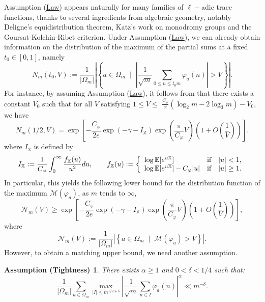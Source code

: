 \documentclass[12pt]{amsart}
\newtheorem*{AssT}{Assumption (Tightness)}
\theoremstyle{definition}
\numberwithin{equation}{section}
\numberwithin{equation}{section}
\def\E{\mathbb{E}}
\def\Ncal{\mathcal{N}}
\def\M{\mathcal{M}}
\def\Mp{C_\varphi}
\def\X{\mathbb{X}}
\def\E{\mathbb{E}}
\begin{document}
Assumption (\hyperlink{Ass Law}{Law}) appears naturally
for many families of $\ell-$adic trace functions, thanks to several ingredients from algebraic geometry, notably Deligne's equidistribution theorem, Katz's work on monodromy groups and the Goursat-Kolchin-Ribet criterion.  
Under Assumption (\hyperlink{Ass Law}{Law}), we can already obtain information on the distribution of the maximum of the partial sums at a fixed $t_0 \in [0,1]$, namely
\begin{equation}\label{def Nm(t_0, V)}
   N_m(t_0, V) := \frac{1}{|\Omega_m|}\left|\left\{
a\in \Omega_m\;\; \big|\;\; \left|
\frac{1}{\sqrt{m}}\sum_{0\leq n\leq t_0 m} \varphi_a(n)
\right|> V
\right\}\right|. 
\end{equation}
For instance, by assuming Assumption (\hyperlink{Ass Law}{Law}),  it follows from \cite[Theorem 7.1]{ABL21} that there exists a constant $V_0$ such that 
for all \(V\) satisfying $1\leq V \leq$
$\frac{\Mp}{\pi} \left(\log_2 m-2\log_3 m\right)-V_0$, we have
\begin{equation}\label{eq ABL Nm(1/2,V)}
N_m(1/2,V)
=
\exp\left[- \frac{\Mp}{2 e} \exp\left(-\gamma-I_\X \right)\exp\left(\frac{\pi }{\Mp}V\right)
\left(1+O\left(\frac{1}{V}\right)\right) 
\right].
\end{equation}
where $
I_\X $ is defined by
\begin{equation}\label{def f_X}
I_\X :=\frac{1}{\Mp}\int_0^\infty \frac{f_{\X}(u)}{u^2}du, \qquad
f_\X(u) :=\left\{
\begin{array}{l cc l}
         \log \E[e^{u\X}] & \text{if}  & |u|<1,\\
     \log \E[e^{u\X}]- \Mp|u| & \text{if}  & |u|\geq 1. 
\end{array}
\right.
\end{equation}
In particular, this yields the following lower bound for the distribution function of the maximum $\M(\varphi_a)$, as $m$ tends to $\infty$,
\[\Ncal_m(V)\geq \exp\left[- \frac{\Mp}{2 e} \exp\left(-\gamma-I_\X \right)\exp\left(\frac{\pi }{\Mp}V\right)
\left(1+O\left(\frac{1}{V}\right)\right) 
\right],\] 
where
\[
\Ncal_m(V):=
\frac{1}{|\Omega_m|}\left|\left\{
a\in \Omega_m\;\; \big|\;\;\M(\varphi_a)> V
\right\}\right|.
\]
However, to obtain a matching upper bound, we need another assumption.
\begin{AssT}\label{Ass Tightness} \hypertarget{Ass Tightness}{
There exists $\alpha\geq 1$ and $0<\delta<1/4$ such that:}
\[
\frac{1}{|\Omega_m|}\sum_{a\in\Omega_m}
\max_{|I|\leq m^{1/2+\delta}}\left|
\frac{1}{\sqrt{m}}\sum_{n\in I} \varphi_a(n)
\right|^{\alpha } \ll
m^{-\delta}.
\]
\end{AssT}
\end{document}
